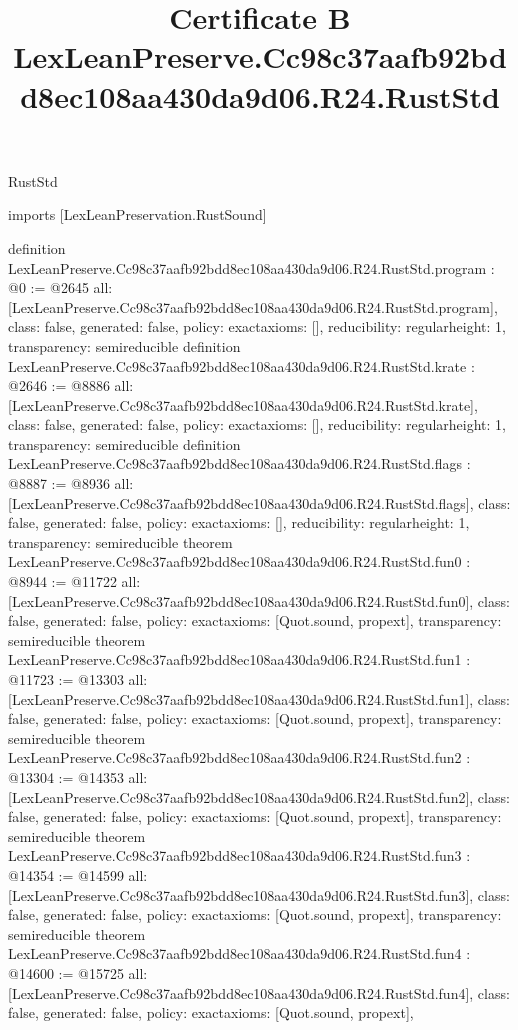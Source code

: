 \begin{lexlean}{RustStd}
\title{Certificate B LexLeanPreserve.Cc98c37aafb92bdd8ec108aa430da9d06.R24.RustStd}
\begin{coremodule}
imports [LexLeanPreservation.RustSound]

definition LexLeanPreserve.Cc98c37aafb92bdd8ec108aa430da9d06.R24.RustStd.program : @0 := @2645 {
  all: [LexLeanPreserve.Cc98c37aafb92bdd8ec108aa430da9d06.R24.RustStd.program],
  class: false,
  generated: false,
  policy: exact{axioms: []},
  reducibility: regular{height: 1},
  transparency: semireducible
}
definition LexLeanPreserve.Cc98c37aafb92bdd8ec108aa430da9d06.R24.RustStd.krate : @2646 := @8886 {
  all: [LexLeanPreserve.Cc98c37aafb92bdd8ec108aa430da9d06.R24.RustStd.krate],
  class: false,
  generated: false,
  policy: exact{axioms: []},
  reducibility: regular{height: 1},
  transparency: semireducible
}
definition LexLeanPreserve.Cc98c37aafb92bdd8ec108aa430da9d06.R24.RustStd.flags : @8887 := @8936 {
  all: [LexLeanPreserve.Cc98c37aafb92bdd8ec108aa430da9d06.R24.RustStd.flags],
  class: false,
  generated: false,
  policy: exact{axioms: []},
  reducibility: regular{height: 1},
  transparency: semireducible
}
theorem LexLeanPreserve.Cc98c37aafb92bdd8ec108aa430da9d06.R24.RustStd.fun0 : @8944 := @11722 {
  all: [LexLeanPreserve.Cc98c37aafb92bdd8ec108aa430da9d06.R24.RustStd.fun0],
  class: false,
  generated: false,
  policy: exact{axioms: [Quot.sound, propext]},
  transparency: semireducible
}
theorem LexLeanPreserve.Cc98c37aafb92bdd8ec108aa430da9d06.R24.RustStd.fun1 : @11723 := @13303 {
  all: [LexLeanPreserve.Cc98c37aafb92bdd8ec108aa430da9d06.R24.RustStd.fun1],
  class: false,
  generated: false,
  policy: exact{axioms: [Quot.sound, propext]},
  transparency: semireducible
}
theorem LexLeanPreserve.Cc98c37aafb92bdd8ec108aa430da9d06.R24.RustStd.fun2 : @13304 := @14353 {
  all: [LexLeanPreserve.Cc98c37aafb92bdd8ec108aa430da9d06.R24.RustStd.fun2],
  class: false,
  generated: false,
  policy: exact{axioms: [Quot.sound, propext]},
  transparency: semireducible
}
theorem LexLeanPreserve.Cc98c37aafb92bdd8ec108aa430da9d06.R24.RustStd.fun3 : @14354 := @14599 {
  all: [LexLeanPreserve.Cc98c37aafb92bdd8ec108aa430da9d06.R24.RustStd.fun3],
  class: false,
  generated: false,
  policy: exact{axioms: [Quot.sound, propext]},
  transparency: semireducible
}
theorem LexLeanPreserve.Cc98c37aafb92bdd8ec108aa430da9d06.R24.RustStd.fun4 : @14600 := @15725 {
  all: [LexLeanPreserve.Cc98c37aafb92bdd8ec108aa430da9d06.R24.RustStd.fun4],
  class: false,
  generated: false,
  policy: exact{axioms: [Quot.sound, propext]},
}
\end{coremodule}
\end{lexlean}
